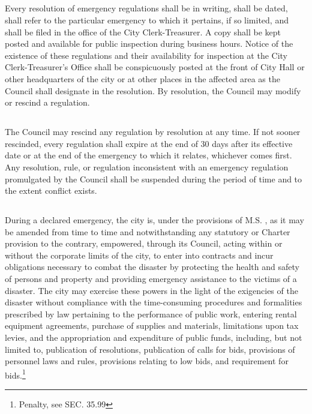 \subsection{}
Every resolution of emergency regulations shall be in writing, shall be dated, shall refer to the particular emergency to which it pertains, if so limited, and shall be filed in the office of the City Clerk-Treasurer. A copy shall be kept posted and available for public inspection during business hours. Notice of the existence of these regulations and their availability for inspection at the City Clerk-Treasurer’s Office shall be conspicuously posted at the front of City Hall or other headquarters of the city or at other places in the affected area as the Council shall designate in the resolution. By resolution, the Council may modify or rescind a regulation.
\subsection{}
The Council may rescind any regulation by resolution at any time. If not sooner rescinded, every regulation shall expire at the end of 30 days after its effective date or at the end of the emergency to which it relates, whichever comes first. Any resolution, rule, or regulation inconsistent with an emergency regulation promulgated by the Council shall be suspended during the period of time and to the extent conflict exists.
\subsection{}
During a declared emergency, the city is, under the provisions of M.S. , as it may be amended from time to time and notwithstanding any statutory or Charter provision to the contrary, empowered, through its Council, acting within or without the corporate limits of the city, to enter into contracts and incur obligations necessary to combat the disaster by protecting the health and safety of persons and property and providing emergency assistance to the victims of a disaster. The city may exercise these powers in the light of the exigencies of the disaster without compliance with the time-consuming procedures and formalities prescribed by law pertaining to the performance of public work, entering rental equipment agreements, purchase of supplies and materials, limitations upon tax levies, and the appropriation and expenditure of public funds, including, but not limited to, publication of resolutions, publication of calls for bids, provisions of personnel laws and rules, provisions relating to low bids, and requirement for bids.\footnote{Penalty, see SEC. 35.99}

